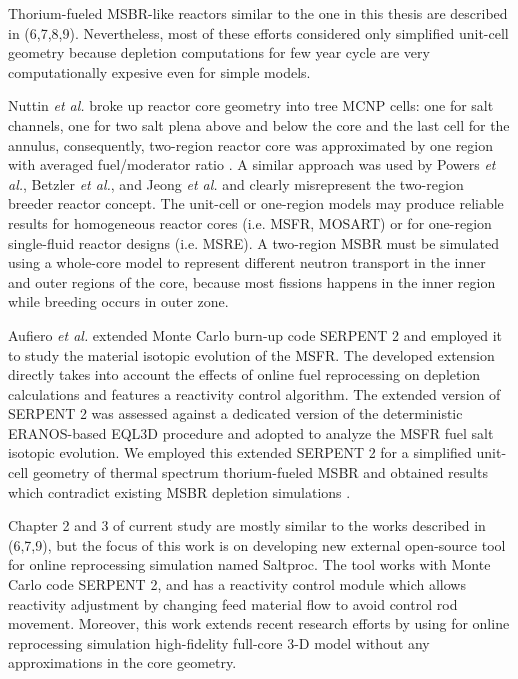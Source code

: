 Thorium-fueled \gls{MSBR}-like reactors similar to the one in this thesis are described in (6,7,8,9). Nevertheless, most of these efforts considered only simplified unit-cell geometry because depletion computations for few year cycle are very computationally expesive even for simple models. 

Nuttin \emph{et al.} broke up reactor core geometry into tree \gls{MCNP} cells: one for salt channels, one for two salt plena above and below the core and the last cell for the annulus, consequently, two-region reactor core was approximated by one region with averaged fuel/moderator ratio \cite{nuttin_potential_2005}.  A similar approach was used by Powers \emph{et al.}, Betzler \emph{et al.}, and Jeong \emph{et al.} \cite{powers_new_2013,powers_inventory_2014,betzler_modeling_2016, betzler_molten_2017, jeong_development_2014, jeong_equilibrium_2016} and clearly misrepresent the two-region breeder reactor concept. The unit-cell or one-region models may produce reliable results for homogeneous reactor cores (i.e. \gls{MSFR}, \gls{MOSART}) or for one-region single-fluid reactor designs (i.e. \gls{MSRE}). A two-region \gls{MSBR} must be simulated using a whole-core model to represent different neutron transport in the inner and outer regions of the core, because most fissions happens in the inner region while breeding occurs in outer zone.  

Aufiero \emph{et al.} extended Monte Carlo burn-up code SERPENT 2 and employed it to study the material isotopic evolution of the \gls{MSFR}. The developed extension directly takes into account the effects of online fuel reprocessing on depletion calculations and features a reactivity control algorithm. The extended version of SERPENT 2 was assessed against a dedicated version of the deterministic ERANOS-based EQL3D procedure \cite{ruggieri_eranos_2006} and adopted to analyze the \gls{MSFR} fuel salt isotopic evolution. We employed this extended SERPENT 2 for a simplified unit-cell geometry of thermal spectrum thorium-fueled \gls{MSBR} and obtained results which contradict existing \gls{MSBR} depletion simulations \cite{jeong_equilibrium_2016}.

Chapter 2 and 3 of current study are mostly similar to the works described in (6,7,9), but the focus of this work is on developing new external open-source tool for online reprocessing simulation named Saltproc. The tool works with Monte Carlo code SERPENT 2, and has a reactivity control module which allows reactivity adjustment by changing feed material flow to avoid control rod movement. Moreover, this work extends recent research efforts by using for online reprocessing simulation high-fidelity full-core 3-D model without any approximations in the core geometry.

